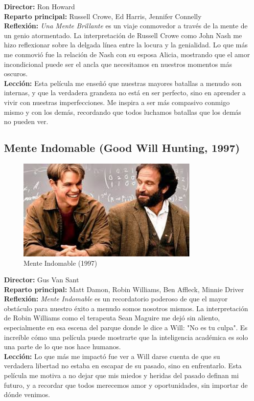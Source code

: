 \documentclass[12pt,a4paper,spanish]{article}
\begin{document}
\textbf{Director:} Ron Howard\\
\textbf{Reparto principal:} Russell Crowe, Ed Harris, Jennifer Connelly\\
\textbf{Reflexión:} \emph{Una Mente Brillante} es un viaje conmovedor a través de la mente de un genio atormentado. La interpretación de Russell Crowe como John Nash me hizo reflexionar sobre la delgada línea entre la locura y la genialidad. Lo que más me conmovió fue la relación de Nash con su esposa Alicia, mostrando que el amor incondicional puede ser el ancla que necesitamos en nuestros momentos más oscuros.\\

\textbf{Lección:} Esta película me enseñó que nuestras mayores batallas a menudo son internas, y que la verdadera grandeza no está en ser perfecto, sino en aprender a vivir con nuestras imperfecciones. Me inspira a ser más compasivo conmigo mismo y con los demás, recordando que todos luchamos batallas que los demás no pueden ver.

\vspace{1cm}

\subsection{Mente Indomable (Good Will Hunting, 1997)}
\begin{figure}[H]
    \centering
    \includegraphics[width=0.8\textwidth]{mente_indomable.jpg}
    \caption{Mente Indomable (1997)}
    \label{fig:mente_indomable}
\end{figure}

\textbf{Director:} Gus Van Sant\\
\textbf{Reparto principal:} Matt Damon, Robin Williams, Ben Affleck, Minnie Driver\\
\textbf{Reflexión:} \emph{Mente Indomable} es un recordatorio poderoso de que el mayor obstáculo para nuestro éxito a menudo somos nosotros mismos. La interpretación de Robin Williams como el terapeuta Sean Maguire me dejó sin aliento, especialmente en esa escena del parque donde le dice a Will: "No es tu culpa". Es increíble cómo una película puede mostrarte que la inteligencia académica es solo una parte de lo que nos hace humanos.\\

\textbf{Lección:} Lo que más me impactó fue ver a Will darse cuenta de que su verdadera libertad no estaba en escapar de su pasado, sino en enfrentarlo. Esta película me motiva a no dejar que mis miedos y heridas del pasado definan mi futuro, y a recordar que todos merecemos amor y oportunidades, sin importar de dónde venimos.
\end{document}

